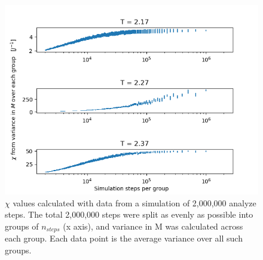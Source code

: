 \documentclass[letter,scriptaddress,twocolumn, prl]{revtex4}
\begin{document}
\begin{figure}[h]
	\begin{center}
		\includegraphics[width=.4\textwidth]{figs/figA1.png}
		\caption{$\chi$ values calculated with data from a simulation of 2,000,000 analyze steps. The total 2,000,000 steps were split as evenly as possible into groups of $n_{steps}$ (x axis), and variance in M was calculated across each group. Each data point is the average variance over all such groups.}
		\label{fig:figA1}
	\end{center}
\end{figure}
\end{document}
